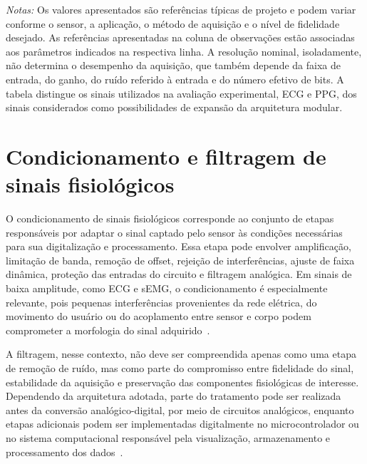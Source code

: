 \documentclass[a4paper,12pt]{fcte}
\begin{document}
\begin{landscape}
\begin{longtable}
    \bottomrule
\end{longtable}

\begin{flushleft}
    \footnotesize
    \textit{Notas:} Os valores apresentados são referências típicas de projeto e podem variar conforme o sensor, a aplicação, o método de aquisição e o nível de fidelidade desejado. As referências apresentadas na coluna de observações estão associadas aos parâmetros indicados na respectiva linha. A resolução nominal, isoladamente, não determina o desempenho da aquisição, que também depende da faixa de entrada, do ganho, do ruído referido à entrada e do número efetivo de bits. A tabela distingue os sinais utilizados na avaliação experimental, ECG e PPG, dos sinais considerados como possibilidades de expansão da arquitetura modular.
\end{flushleft}

\normalsize
\end{landscape}

\section{Condicionamento e filtragem de sinais fisiológicos}

O condicionamento de sinais fisiológicos corresponde ao conjunto de etapas responsáveis por adaptar o sinal captado pelo sensor às condições necessárias para sua digitalização e processamento. Essa etapa pode envolver amplificação, limitação de banda, remoção de offset, rejeição de interferências, ajuste de faixa dinâmica, proteção das entradas do circuito e filtragem analógica. Em sinais de baixa amplitude, como ECG e sEMG, o condicionamento é especialmente relevante, pois pequenas interferências provenientes da rede elétrica, do movimento do usuário ou do acoplamento entre sensor e corpo podem comprometer a morfologia do sinal adquirido~\cite{ardeti2023ecg,raus2025ecg_testing}.

A filtragem, nesse contexto, não deve ser compreendida apenas como uma etapa de remoção de ruído, mas como parte do compromisso entre fidelidade do sinal, estabilidade da aquisição e preservação das componentes fisiológicas de interesse. Dependendo da arquitetura adotada, parte do tratamento pode ser realizada antes da conversão analógico-digital, por meio de circuitos analógicos, enquanto etapas adicionais podem ser implementadas digitalmente no microcontrolador ou no sistema computacional responsável pela visualização, armazenamento e processamento dos dados~\cite{chu2023ecgsystem,ardeti2023ecg}.
\end{document}
